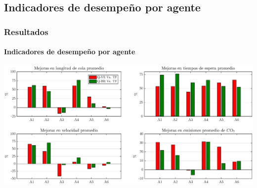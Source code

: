 \documentclass[11pt]{beamer}
\begin{document}
\subsection{Indicadores de desempeño por agente}
\begin{frame}
\frametitle{Resultados}
\framesubtitle{Indicadores de desempeño por agente}
\begin{center}
\includegraphics[scale=0.43]{./graficas/mejorasAgt.eps}
\end{center}
\end{frame}
\end{document}
